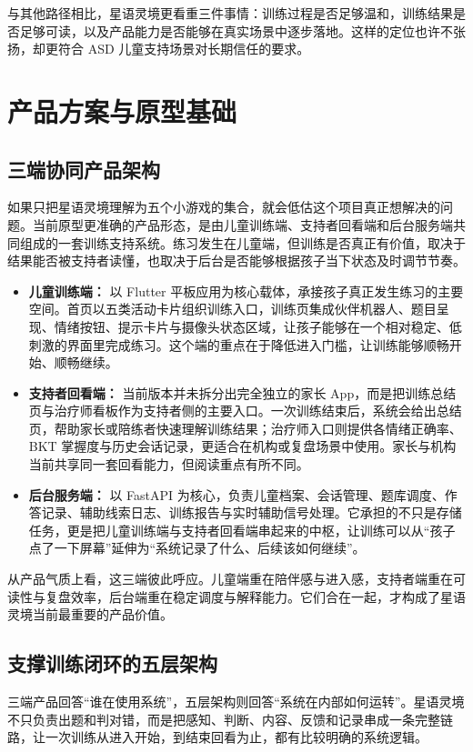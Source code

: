与其他路径相比，星语灵境更看重三件事情：训练过程是否足够温和，训练结果是否足够可读，以及产品能力是否能够在真实场景中逐步落地。这样的定位也许不张扬，却更符合 ASD 儿童支持场景对长期信任的要求。


\chapter{产品方案与原型基础}

\section{三端协同产品架构}
如果只把星语灵境理解为五个小游戏的集合，就会低估这个项目真正想解决的问题。当前原型更准确的产品形态，是由儿童训练端、支持者回看端和后台服务端共同组成的一套训练支持系统。练习发生在儿童端，但训练是否真正有价值，取决于结果能否被支持者读懂，也取决于后台是否能够根据孩子当下状态及时调节节奏。

\begin{itemize}
  \item \textbf{儿童训练端：} 以 Flutter 平板应用为核心载体，承接孩子真正发生练习的主要空间。首页以五类活动卡片组织训练入口，训练页集成伙伴机器人、题目呈现、情绪按钮、提示卡片与摄像头状态区域，让孩子能够在一个相对稳定、低刺激的界面里完成练习。这个端的重点在于降低进入门槛，让训练能够顺畅开始、顺畅继续。
  \item \textbf{支持者回看端：} 当前版本并未拆分出完全独立的家长 App，而是把训练总结页与治疗师看板作为支持者侧的主要入口。一次训练结束后，系统会给出总结页，帮助家长或陪练者快速理解训练结果；治疗师入口则提供各情绪正确率、BKT 掌握度与历史会话记录，更适合在机构或复盘场景中使用。家长与机构当前共享同一套回看能力，但阅读重点有所不同。
  \item \textbf{后台服务端：} 以 FastAPI 为核心，负责儿童档案、会话管理、题库调度、作答记录、辅助线索日志、训练报告与实时辅助信号处理。它承担的不只是存储任务，更是把儿童训练端与支持者回看端串起来的中枢，让训练可以从“孩子点了一下屏幕”延伸为“系统记录了什么、后续该如何继续”。
\end{itemize}

从产品气质上看，这三端彼此呼应。儿童端重在陪伴感与进入感，支持者端重在可读性与复盘效率，后台端重在稳定调度与解释能力。它们合在一起，才构成了星语灵境当前最重要的产品价值。

\section{支撑训练闭环的五层架构}
三端产品回答“谁在使用系统”，五层架构则回答“系统在内部如何运转”。星语灵境不只负责出题和判对错，而是把感知、判断、内容、反馈和记录串成一条完整链路，让一次训练从进入开始，到结束回看为止，都有比较明确的系统逻辑。


